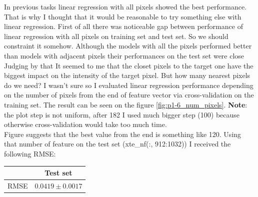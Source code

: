\documentclass{article}
\begin{document}
		 	In previous tasks linear regression with all pixels showed the best performance. That is why I thought that it would be reasonable to try something else with linear regression. First of all there was noticeable gap between performance of linear regression with all pixels on training set and test set. So we should constraint it somehow. Although the models with all the pixels performed better than models with adjacent pixels their performances on the test set were close Judging by that It seemed to me that the closet pixels to the target one have the biggest impact on the intensity of the target pixel.  But how many nearest pixels do we need? I wasn't sure so I evaluated linear regression performance depending on the number of pixels from the end of feature vector via cross-validation on the training set. The result can be seen on the figure \ref{fig:p1-6_num_pixels}. \textbf{Note}: the plot step is not uniform, after 182 I used much bigger step (100) because otherwise cross-validation would take too much time.\\ Figure suggests that the best value from the end is something like 120. Using that number of feature on the test set (xte\_nf(:, 912:1032)) I received the following RMSE:
			\begin{center}
				\begin{tabular}{| c | c | }
					\hline
					\, &  Test set \\ \hline
					RMSE & $0.0419 \pm 0.0017$ \\ 
					\hline
				\end{tabular}
			\end{center}
			
\end{document}
